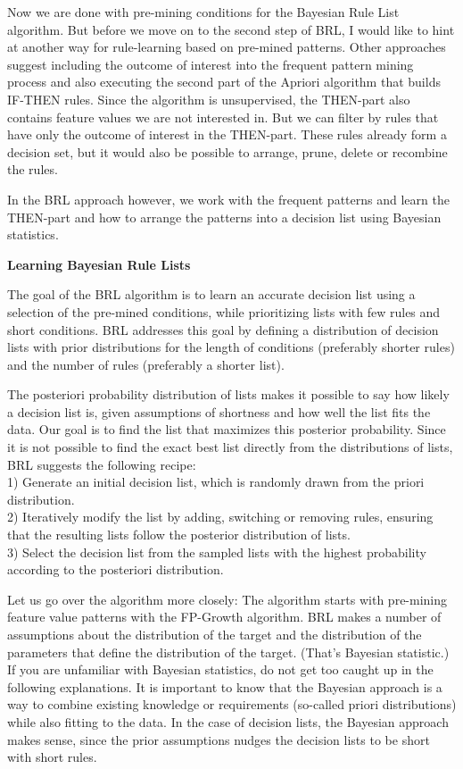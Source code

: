 \documentclass[12pt,]{krantz}
\begin{document}
Now we are done with pre-mining conditions for the Bayesian Rule List
algorithm. But before we move on to the second step of BRL, I would like
to hint at another way for rule-learning based on pre-mined patterns.
Other approaches suggest including the outcome of interest into the
frequent pattern mining process and also executing the second part of
the Apriori algorithm that builds IF-THEN rules. Since the algorithm is
unsupervised, the THEN-part also contains feature values we are not
interested in. But we can filter by rules that have only the outcome of
interest in the THEN-part. These rules already form a decision set, but
it would also be possible to arrange, prune, delete or recombine the
rules.

In the BRL approach however, we work with the frequent patterns and
learn the THEN-part and how to arrange the patterns into a decision list
using Bayesian statistics.

\textbf{Learning Bayesian Rule Lists}

The goal of the BRL algorithm is to learn an accurate decision list
using a selection of the pre-mined conditions, while prioritizing lists
with few rules and short conditions. BRL addresses this goal by defining
a distribution of decision lists with prior distributions for the length
of conditions (preferably shorter rules) and the number of rules
(preferably a shorter list).

The posteriori probability distribution of lists makes it possible to
say how likely a decision list is, given assumptions of shortness and
how well the list fits the data. Our goal is to find the list that
maximizes this posterior probability. Since it is not possible to find
the exact best list directly from the distributions of lists, BRL
suggests the following recipe:\\
1) Generate an initial decision list, which is randomly drawn from the
priori distribution.\\
2) Iteratively modify the list by adding, switching or removing rules,
ensuring that the resulting lists follow the posterior distribution of
lists.\\
3) Select the decision list from the sampled lists with the highest
probability according to the posteriori distribution.

Let us go over the algorithm more closely: The algorithm starts with
pre-mining feature value patterns with the FP-Growth algorithm. BRL
makes a number of assumptions about the distribution of the target and
the distribution of the parameters that define the distribution of the
target. (That's Bayesian statistic.) If you are unfamiliar with Bayesian
statistics, do not get too caught up in the following explanations. It
is important to know that the Bayesian approach is a way to combine
existing knowledge or requirements (so-called priori distributions)
while also fitting to the data. In the case of decision lists, the
Bayesian approach makes sense, since the prior assumptions nudges the
decision lists to be short with short rules.
\end{document}
